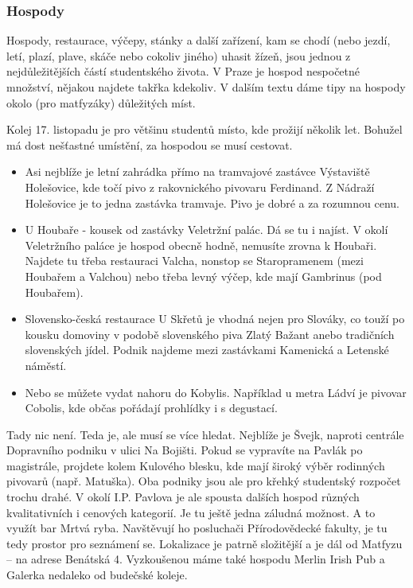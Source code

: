 \subsubsection{Hospody}
Hospody, restaurace, výčepy, stánky a další zařízení, kam se chodí (nebo jezdí,
letí, plazí, plave, skáče nebo cokoliv jiného) uhasit žízeň, jsou jednou z
nejdůležitějších částí studentského života. V Praze je  hospod nespočetné množství, nějakou najdete takřka
kdekoliv. V dalším textu dáme tipy na hospody okolo (pro matfyzáky) důležitých míst.

Kolej 17. listopadu je pro většinu studentů místo, kde prožijí několik let.
Bohužel má dost nešťastné umístění, za hospodou se musí cestovat.
\begin{itemize}
\item Asi nejblíže je letní zahrádka přímo na tramvajové zastávce Výstaviště
Holešovice, kde točí pivo z rakovnického pivovaru Ferdinand. Z Nádraží
Holešovice je to jedna zastávka tramvaje. Pivo je dobré a za rozumnou cenu.
\item U Houbaře - kousek od zastávky Veletržní palác. Dá se tu
i najíst. V okolí Veletržního paláce je hospod obecně hodně, nemusíte zrovna
k Houbaři. Najdete tu třeba restauraci Valcha, nonstop se
Staropramenem (mezi Houbařem a Valchou) nebo třeba levný výčep, kde mají
Gambrinus (pod Houbařem).
\item Slovensko-česká restaurace U Skřetů je vhodná nejen pro Slováky, co
touží po kousku domoviny v podobě slovenského piva Zlatý Bažant anebo tradičních
slovenských jídel. Podnik najdeme mezi zastávkami Kamenická a Letenské náměstí.
\item Nebo se můžete vydat nahoru do Kobylis. Například u metra Ládví je pivovar
Cobolis, kde občas pořádají prohlídky i s degustací.
\end{itemize}

Tady nic není. Teda je, ale musí se více hledat. Nejblíže je Švejk, naproti
centrále Dopravního podniku v ulici Na Bojišti. Pokud se vypravíte na Pavlák po
magistrále,
projdete kolem Kulového blesku, kde mají široký výběr rodinných pivovarů (např.
Matuška). Oba podniky jsou ale pro křehký studentský rozpočet trochu drahé. V okolí I.P. Pavlova je ale spousta dalších hospod různých kvalitativních i cenových kategorií.
Je tu ještě jedna záludná možnost. A to využít bar Mrtvá ryba.
Navštěvují ho posluchači Přírodovědecké fakulty, je tu tedy prostor pro
seznámení se. Lokalizace je
patrně složitější a je dál od Matfyzu -- na adrese Benátská 4.
Vyzkoušenou máme také hospodu Merlin Irish Pub a Galerka nedaleko od budečské
koleje.

